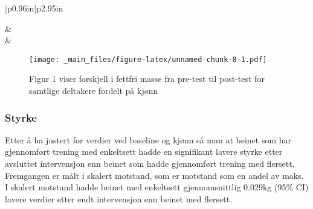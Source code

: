 \documentclass[
]{book}
\begin{document}
\begin{longtable}[c]{|p{0.96in}|p{2.95in}}
\endfoot



 &  \\





 &  \\

\noalign{\global\setlength{\arrayrulewidth}{2pt}}



\end{longtable}

\begin{figure}
\centering
\texttt{[image: \_main\_files/figure-latex/unnamed-chunk-8-1.pdf]}
\caption{\label{fig:unnamed-chunk-8}Figur 1 viser forskjell i fettfri masse fra pre-test til post-test for samtlige deltakere fordelt på kjønn}
\end{figure}

\hypertarget{styrke}{%
\subsubsection{Styrke}\label{styrke}}

Etter å ha justert for verdier ved baseline og kjønn så man at beinet som har gjennomført trening med enkeltsett hadde en signifikant lavere styrke etter avsluttet intervensjon enn beinet som hadde gjennomført trening med flersett. Fremgangen er målt i skalert motstand, som er motstand som en andel av maks. I skalert motstand hadde beinet med enkeltsett gjennomsnittlig 0.029kg (95\% CI) lavere verdier etter endt intervensjon enn beinet med flersett.
\end{document}
